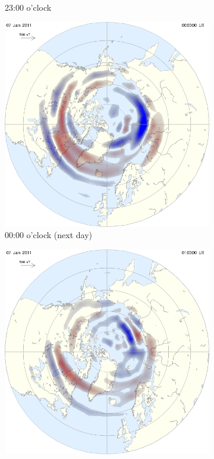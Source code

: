 \documentclass[10pt,a4paper]{article}
\begin{document}
\begin{figure}[h]
\begin{subfigure}{0.3\textwidth}
	\caption{ 23:00 o'clock \label{amp23}}
\end{subfigure}
\begin{subfigure}{0.3\textwidth}
\centering
	\includegraphics[width=\textwidth]{ampere6.png}
	\caption{ 00:00 o'clock (next day) \label{amp00}}
\end{subfigure}
\begin{subfigure}{0.3\textwidth}
\centering
	\includegraphics[width=\textwidth]{ampere7.png}

\end{subfigure}
\end{figure}
\end{document}
